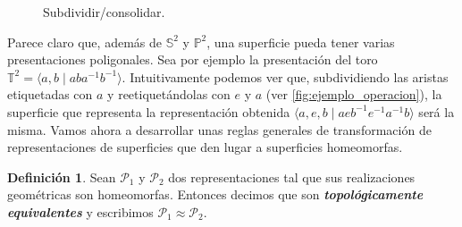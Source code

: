 \documentclass[10pt]{report}
\newcommand{\Esfera}{\mathbb{S}^2}
\newcommand{\Toro}{\mathbb{T}^2}
\newcommand{\Proyectivo}{\mathbb{P}^2}
\newcommand{\enfatiza}[1]{\textbf{\textit{#1}}}
\theoremstyle{definition}
\newtheorem{defin}{Definición}[section]
\begin{document}
\begin{figure}[h]%
\centering
{}

\caption{Subdividir/consolidar. \label{fig:ejemplo_operacion}}
\end{figure}


Parece claro que, además de $\Esfera$ y $\Proyectivo$, una superficie pueda tener varias presentaciones poligonales. Sea por ejemplo la presentación del toro $\Toro=\langle a,b\mid aba^{-1}b^{-1}\rangle$. Intuitivamente podemos ver que, subdividiendo las aristas etiquetadas con $a$ y reetiquetándolas con $e$ y $a$ (ver \autoref{fig:ejemplo_operacion}), la superficie que representa la representación obtenida $\langle a,e,b\mid  aeb^{-1}e^{-1}a^{-1}b\rangle$ será la misma.
Vamos ahora a desarrollar unas reglas generales de transformación de representaciones de superficies que den lugar a superficies homeomorfas.



\begin{defin}%
Sean $\mathcal{P}_1$ y $\mathcal{P}_2$ dos representaciones tal que sus realizaciones geométricas son homeomorfas. Entonces decimos que son \enfatiza{topológicamente equivalentes} y escribimos $\mathcal{P}_1 \approx \mathcal{P}_2$.
\end{defin}
\end{document}
